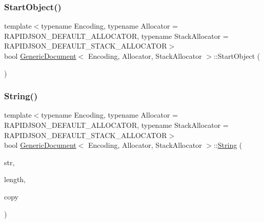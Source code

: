 \subsubsection{\texorpdfstring{Start\+Object()}{StartObject()}}
{\footnotesize\ttfamily template$<$typename Encoding, typename Allocator = R\+A\+P\+I\+D\+J\+S\+O\+N\+\_\+\+D\+E\+F\+A\+U\+L\+T\+\_\+\+A\+L\+L\+O\+C\+A\+T\+OR, typename Stack\+Allocator = R\+A\+P\+I\+D\+J\+S\+O\+N\+\_\+\+D\+E\+F\+A\+U\+L\+T\+\_\+\+S\+T\+A\+C\+K\+\_\+\+A\+L\+L\+O\+C\+A\+T\+OR$>$ \\
bool \hyperlink{classGenericDocument}{Generic\+Document}$<$ Encoding, Allocator, Stack\+Allocator $>$\+::Start\+Object (\begin{DoxyParamCaption}{ }\end{DoxyParamCaption})\hspace{0.3cm}{\ttfamily [inline]}}

\mbox{\label{classGenericDocument_ad319fcc9e13606b6795424b9374a7398}} 
\subsubsection{\texorpdfstring{String()}{String()}}
{\footnotesize\ttfamily template$<$typename Encoding, typename Allocator = R\+A\+P\+I\+D\+J\+S\+O\+N\+\_\+\+D\+E\+F\+A\+U\+L\+T\+\_\+\+A\+L\+L\+O\+C\+A\+T\+OR, typename Stack\+Allocator = R\+A\+P\+I\+D\+J\+S\+O\+N\+\_\+\+D\+E\+F\+A\+U\+L\+T\+\_\+\+S\+T\+A\+C\+K\+\_\+\+A\+L\+L\+O\+C\+A\+T\+OR$>$ \\
bool \hyperlink{classGenericDocument}{Generic\+Document}$<$ Encoding, Allocator, Stack\+Allocator $>$\+::\hyperlink{structGenericValue_1_1String}{String} (\begin{DoxyParamCaption}\item[{const \hyperlink{classGenericValue_ade0e0ce64ccd5d852da57a35e720bafb}{Ch} $\ast$}]{str,  }\item[{\hyperlink{rapidjson_8h_a5ed6e6e67250fadbd041127e6386dcb5}{Size\+Type}}]{length,  }\item[{bool}]{copy }\end{DoxyParamCaption})\hspace{0.3cm}{\ttfamily [inline]}}

\mbox{\label{classGenericDocument_a6290e1290fad74177625af5938c0c58f}} 
